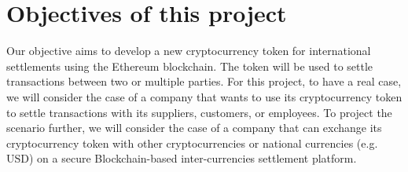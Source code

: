 \section{Objectives of this project}

Our objective aims to develop a new cryptocurrency token for international settlements using the Ethereum blockchain. The token will be used to settle transactions
between two or multiple parties. For this project, to have a real case, we will consider the case of a company that wants to use its cryptocurrency token to settle transactions with its suppliers, customers, or employees.
To project the scenario further, we will consider the case of a company that can exchange its cryptocurrency token with other cryptocurrencies or national currencies (e.g. USD) on a secure Blockchain-based inter-currencies settlement
platform.






